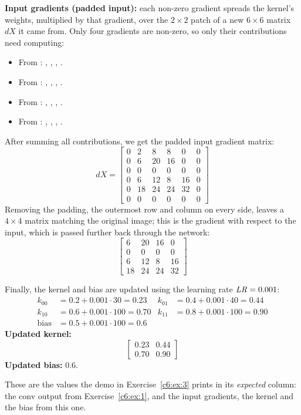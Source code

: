 \textbf{Input gradients (padded input):} each non-zero gradient spreads the kernel's weights,
multiplied by that gradient, over the $2 \times 2$ patch of a new $6 \times 6$ matrix $dX$ it came
from. Only four gradients are non-zero, so only their contributions need computing:
\begin{itemize}
  \item From : , , ,
    .
  \item From : , , ,
    .
  \item From : , , ,
    .
  \item From : , , ,
    .
\end{itemize}
After summing all contributions, we get the padded input gradient matrix:
\[
  dX = \begin{bmatrix}
    0 & 2 & 8 & 8 & 0 & 0 \\
    0 & 6 & 20 & 16 & 0 & 0 \\
    0 & 0 & 0 & 0 & 0 & 0 \\
    0 & 6 & 12 & 8 & 16 & 0 \\
    0 & 18 & 24 & 24 & 32 & 0 \\
    0 & 0 & 0 & 0 & 0 & 0
  \end{bmatrix}
\]
Removing the padding, the outermost row and column on every side, leaves a $4 \times 4$ matrix
matching the original image; this is the gradient with respect to the input, which is passed further
back through the network:
\[
  \begin{bmatrix}
    6 & 20 & 16 & 0 \\
    0 & 0 & 0 & 0 \\
    6 & 12 & 8 & 16 \\
    18 & 24 & 24 & 32
  \end{bmatrix}
\]

Finally, the kernel and bias are updated using the learning rate $\mathit{LR} = 0.001$:
\begin{align*}
  k_{00} &= 0.2 + 0.001 \cdot 30 = 0.23 &
  k_{01} &= 0.4 + 0.001 \cdot 40 = 0.44 \\
  k_{10} &= 0.6 + 0.001 \cdot 100 = 0.70 &
  k_{11} &= 0.8 + 0.001 \cdot 100 = 0.90 \\
  \text{bias} &= 0.5 + 0.001 \cdot 100 = 0.6
\end{align*}
\textbf{Updated kernel:}
\[
  \begin{bmatrix} 0.23 & 0.44 \\ 0.70 & 0.90 \end{bmatrix}
\]
\textbf{Updated bias:} 0.6.

These are the values the demo in Exercise~\ref{c6:ex:3} prints in its \emph{expected} column: the
conv output from Exercise~\ref{c6:ex:1}, and the input gradients, the kernel and the bias from this
one.
